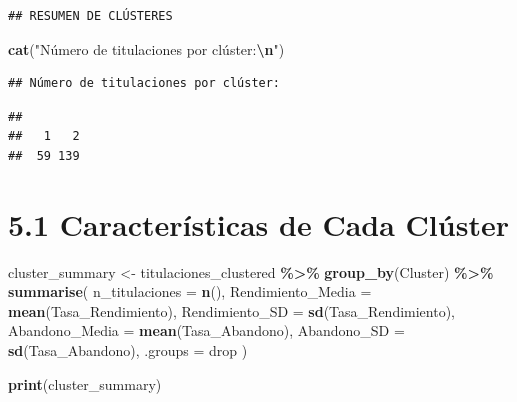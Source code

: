 \documentclass[
]{article}
\newenvironment{Shaded}{\begin{snugshade}}{\end{snugshade}}
\newcommand{\AttributeTok}[1]{\textcolor[rgb]{0.13,0.29,0.53}{#1}}
\newcommand{\FunctionTok}[1]{\textcolor[rgb]{0.13,0.29,0.53}{\textbf{#1}}}
\newcommand{\NormalTok}[1]{#1}
\newcommand{\OtherTok}[1]{\textcolor[rgb]{0.56,0.35,0.01}{#1}}
\newcommand{\SpecialCharTok}[1]{\textcolor[rgb]{0.81,0.36,0.00}{\textbf{#1}}}
\newcommand{\StringTok}[1]{\textcolor[rgb]{0.31,0.60,0.02}{#1}}
\begin{document}
\begin{verbatim}
## RESUMEN DE CLÚSTERES
\end{verbatim}

\begin{Shaded}
\begin{Highlighting}[]
\FunctionTok{cat}\NormalTok{(}\StringTok{"Número de titulaciones por clúster:}\SpecialCharTok{\textbackslash{}n}\StringTok{"}\NormalTok{)}
\end{Highlighting}
\end{Shaded}

\begin{verbatim}
## Número de titulaciones por clúster:
\end{verbatim}

\begin{Shaded}
\end{Shaded}

\begin{verbatim}
## 
##   1   2 
##  59 139
\end{verbatim}

\section{5.1 Características de Cada
Clúster}\label{caracteruxedsticas-de-cada-cluxfaster}

\begin{Shaded}
\begin{Highlighting}[]
\NormalTok{cluster\_summary }\OtherTok{\textless{}{-}}\NormalTok{ titulaciones\_clustered }\SpecialCharTok{\%\textgreater{}\%}
  \FunctionTok{group\_by}\NormalTok{(Cluster) }\SpecialCharTok{\%\textgreater{}\%}
  \FunctionTok{summarise}\NormalTok{(}
    \AttributeTok{n\_titulaciones =} \FunctionTok{n}\NormalTok{(),}
    \AttributeTok{Rendimiento\_Media =} \FunctionTok{mean}\NormalTok{(Tasa\_Rendimiento),}
    \AttributeTok{Rendimiento\_SD =} \FunctionTok{sd}\NormalTok{(Tasa\_Rendimiento),}
    \AttributeTok{Abandono\_Media =} \FunctionTok{mean}\NormalTok{(Tasa\_Abandono),}
    \AttributeTok{Abandono\_SD =} \FunctionTok{sd}\NormalTok{(Tasa\_Abandono),}
    \AttributeTok{.groups =} \StringTok{\textquotesingle{}drop\textquotesingle{}}
\NormalTok{  )}

\FunctionTok{print}\NormalTok{(cluster\_summary)}
\end{Highlighting}
\end{Shaded}
\end{document}
